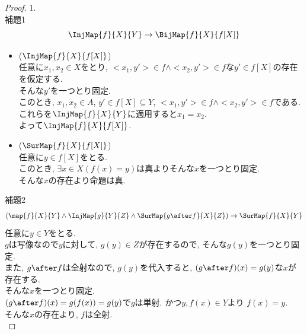 \begin{proof} 1. \\
  補題1\\
  \begin{equation}
    \InjMap{f}{X}{Y} \rightarrow \BijMap{f}{X}{f[X]}
  \end{equation}
  \begin{itemize}
    \item[]\hspace{-0.5cm} ($\InjMap{f}{X}{f[X]}$) \\
      任意に$x_1, x_2 \in X$をとり,
      $<x_1, y'> \in f \land <x_2, y'> \in f$な$y' \in f[X]$の存在を仮定する.\\
      そんな$y'$を一つとり固定.\\
      このとき,
      $x_1, x_2 \in A$,
      $y' \in f[X] \subseteq Y$,
      $<x_1, y'> \in f \land <x_2, y'> \in f$である.\\
      これらを$\InjMap{f}{X}{Y}$に適用すると$x_1 = x_2$.\\
      よって$\InjMap{f}{X}{f[X]}$.
    \item[]\hspace{-0.5cm} ($\SurMap{f}{X}{f[X]}$) \\
      任意に$y \in f[X]$をとる.\\
      このとき,
      $\exists x \in X (f(x) = y)$は真よりそんな$x$を一つとり固定.\\
      そんな$x$の存在より命題は真.
  \end{itemize}
  
  
  補題2
  \begin{equation}
    (\map{f}{X}{Y} \land  \InjMap{g}{Y}{Z} \land \SurMap{g \after f}{X}{Z}) \rightarrow \SurMap{f}{X}{Y}
  \end{equation}
  任意に$y \in Y$をとる.\\
  $g$は写像なので$y$に対して,
  $g(y) \in Z$が存在するので,
  そんな$g(y)$を一つとり固定.\\
  また,
  $g \after f$は全射なので,
  $g(y)$を代入すると,
  $(g \after f)(x) =  g(y)$な$x$が存在する.\\
  そんな$x$を一つとり固定.\\
  $(g \after f)(x) = g(f(x)) = g(y)$で$g$は単射.
  かつ$y , f(x) \in Y$より
  $f(x) = y$.\\
  そんな$x$の存在より,
  $f$は全射.\\



\end{proof}
